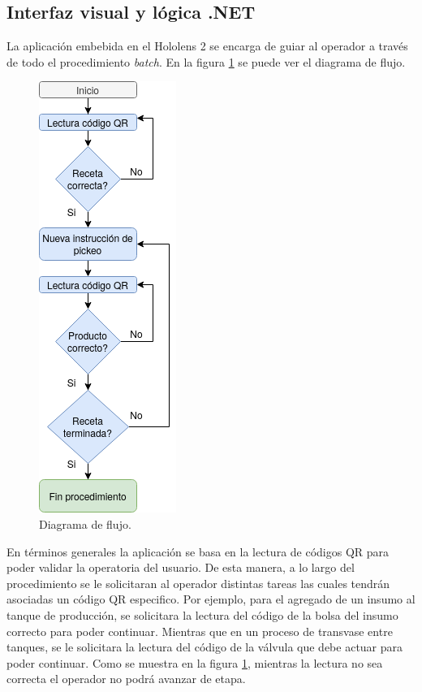 \subsection{Interfaz visual y lógica .NET}

La aplicación embebida en el Hololens 2 se encarga de guiar al operador a través de todo el procedimiento \textit{batch}. En la figura \ref{fig:Flujo} se puede ver el diagrama de flujo.

\begin{figure}[htpb]
	\centering
	\includegraphics[scale=.7]{./Figures/Flujo.png}
	\caption{Diagrama de flujo\protect\footnotemark.}
	\label{fig:Flujo}
\end{figure}

En términos generales la aplicación se basa en la lectura de códigos QR para poder validar la operatoria del usuario. De esta manera, a lo largo del procedimiento se le solicitaran al operador distintas tareas las cuales tendrán asociadas un código QR especifico. Por ejemplo, para el agregado de un insumo al tanque de producción, se solicitara la lectura del código de la bolsa del insumo correcto para poder continuar. Mientras que en un proceso de transvase entre tanques, se le solicitara la lectura del código de la válvula que debe actuar para poder continuar. Como se muestra en la figura \ref{fig:Flujo}, mientras la lectura no sea correcta el operador no podrá avanzar de etapa.

